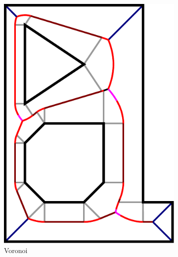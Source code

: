 \begin{figure}
\begin{subfigure}{0.24\columnwidth}
\includegraphics[width=\columnwidth]{sources/method/Voronoi_example.pdf}
\caption{Voronoi}
\end{subfigure}
\begin{subfigure}{0.24\columnwidth}

\end{subfigure}
\end{figure}
